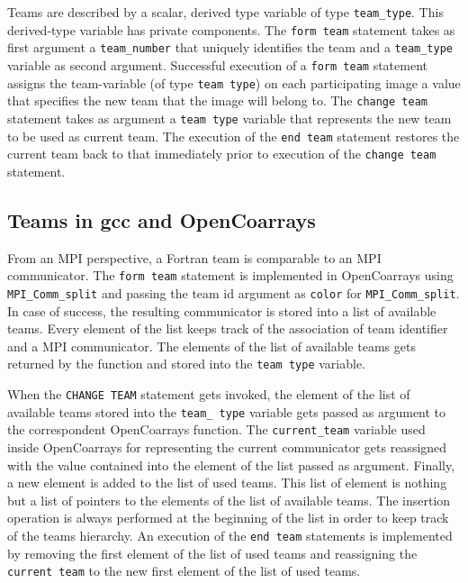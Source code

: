 Teams are described by a scalar, derived type variable of type \texttt{team\_type}. This derived-type variable has private components.
The \texttt{form team} statement takes as first argument a \texttt{team\_number} that uniquely identifies the team and a \texttt{team\_type}
variable as second argument.
Successful execution of a \texttt{form team} statement assigns the team-variable (of type \texttt{team type}) on each
participating image a value that specifies the new team that the image will belong to.
The \texttt{change team} statement takes as argument a \texttt{team type} variable that represents the new team to be used as
current team. The execution of the \texttt{end team} statement restores the current team back
to that immediately prior to execution of the \texttt{change team} statement.

\subsection{Teams in \gls{gcc} and OpenCoarrays}\label{subsec:teams-in-gcc}
From an MPI perspective, a Fortran team is comparable to an MPI communicator. The \texttt{form team} statement is implemented in OpenCoarrays
using \texttt{MPI\_Comm\_split} and passing the team id argument as \texttt{color} for \texttt{MPI\_Comm\_split}.
In case of success, the resulting communicator is stored into a list of available teams.
Every element of the list keeps track of the association of team identifier and a MPI communicator.
The elements of the list of available teams gets returned by the function and stored into the \texttt{team type} variable.

When the \texttt{CHANGE TEAM} statement gets invoked, the element of the list of available teams stored into the \texttt{team\_ type} variable
gets passed as argument to the correspondent OpenCoarrays function. The \texttt{current\_team} variable used inside OpenCoarrays for
representing the current communicator gets reassigned with the value contained into the element of the list passed as argument.
Finally, a new element is added to the list of used teams. This list of element is nothing but a list of pointers to the elements of the list
of available teams. The insertion operation is always performed at the beginning of the list in order to keep track of the teams hierarchy.
An execution of the \texttt{end team} statements is implemented by removing the first element of the list of used teams and reassigning the
\texttt{current team} to the new first element of the list of used teams.

